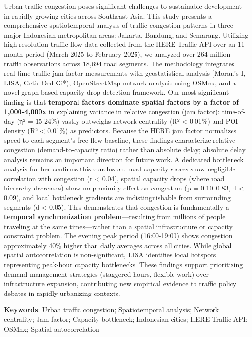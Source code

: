 Urban traffic congestion poses significant challenges to sustainable development in rapidly growing cities across Southeast Asia. This study presents a comprehensive spatiotemporal analysis of traffic congestion patterns in three major Indonesian metropolitan areas: Jakarta, Bandung, and Semarang. Utilizing high-resolution traffic flow data collected from the HERE Traffic API over an 11-month period (March 2025 to February 2026), we analyzed over 264 million traffic observations across 18,694 road segments. The methodology integrates real-time traffic jam factor measurements with geostatistical analysis (Moran's I, LISA, Getis-Ord Gi*), OpenStreetMap network analysis using OSMnx, and a novel graph-based capacity drop detection framework. Our most significant finding is that \textbf{temporal factors dominate spatial factors by a factor of 1,000-4,000x} in explaining variance in relative congestion (jam factor): time-of-day (η² = 15-24\%) vastly outweighs network centrality (R² \textless{} 0.01\%) and POI density (R² \textless{} 0.01\%) as predictors. Because the HERE jam factor normalizes speed to each segment's free-flow baseline, these findings characterize relative congestion (demand-to-capacity ratio) rather than absolute delay; absolute delay analysis remains an important direction for future work. A dedicated bottleneck analysis further confirms this conclusion: road capacity scores show negligible correlation with congestion (r \textless{} 0.04), spatial capacity drops (where road hierarchy decreases) show no proximity effect on congestion (p = 0.10--0.83, \textbar d\textbar{} \textless{} 0.09), and local bottleneck gradients are indistinguishable from surrounding segments (\textbar d\textbar{} \textless{} 0.05). This demonstrates that congestion is fundamentally a \textbf{temporal synchronization problem}---resulting from millions of people traveling at the same times---rather than a spatial infrastructure or capacity constraint problem. The evening peak period (16:00-19:00) shows congestion approximately 40\% higher than daily averages across all cities. While global spatial autocorrelation is non-significant, LISA identifies local hotspots representing peak-hour capacity bottlenecks. These findings support prioritizing demand management strategies (staggered hours, flexible work) over infrastructure expansion, contributing new empirical evidence to traffic policy debates in rapidly urbanizing contexts.

\textbf{Keywords:} Urban traffic congestion; Spatiotemporal analysis; Network centrality; Jam factor; Capacity bottleneck; Indonesian cities; HERE Traffic API; OSMnx; Spatial autocorrelation

